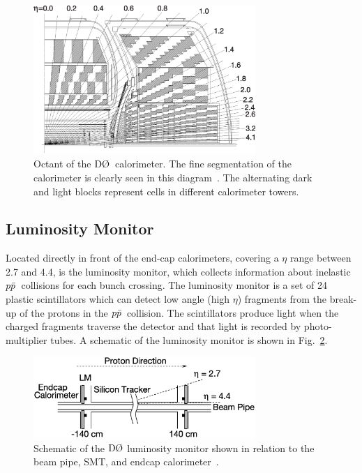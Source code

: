 \begin{figure}[!h!tbp]
\begin{center}
\includegraphics[width=0.75\textwidth]{eps/D0/CalorimeterSegmentation.eps}
\end{center}
\vspace{-0.1in}
\caption{Octant of the $\dzero$~calorimeter. The fine segmentation of the calorimeter is clearly seen in this diagram~\cite{Abazov:2005pn}. The alternating dark and light blocks represent cells in different calorimeter towers.}
\label{CalorimeterSegmentation}
\end{figure}



\subsection{Luminosity Monitor}
\label{luminositydetector}

Located directly in front of the end-cap calorimeters, covering a $\eta$ range between 2.7 and 4.4, is the luminosity monitor, which collects information about inelastic $\mbox{$p\bar{p}$}$~collisions for each bunch crossing. The luminosity monitor is a set of 24 plastic scintillators which can detect low angle (high $\eta$) fragments from the break-up of the protons in the $\mbox{$p\bar{p}$}$~collision. The scintillators produce light when the charged fragments traverse the detector and that light is recorded by photo-multiplier tubes. A schematic of the luminosity monitor is shown in Fig.~\ref{Luminosity}.

\begin{figure}[!h!tbp]
\begin{center}
\includegraphics[width=0.75\textwidth]{eps/D0/Luminosity.eps}
\end{center}
\vspace{-0.1in}
\caption{Schematic of the $\dzero$ luminosity monitor shown in relation to the beam pipe, SMT, and endcap calorimeter~\cite{Abazov:2005pn}.}
\label{Luminosity}
\end{figure}


